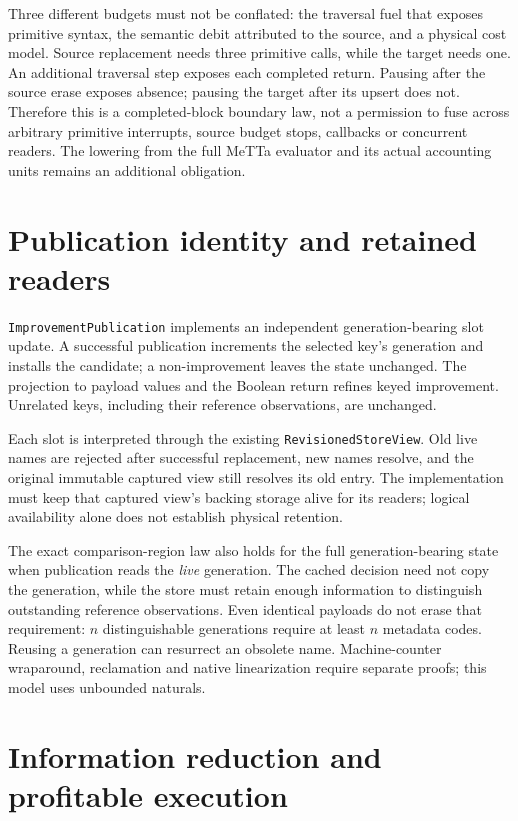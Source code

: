\documentclass[11pt,a4paper]{article}
\newcommand{\code}[1]{\nolinkurl{#1}}
\begin{document}
Three different budgets must not be conflated: the traversal fuel that exposes
primitive syntax, the semantic debit attributed to the source, and a physical
cost model. Source replacement needs three primitive calls, while the target
needs one. An additional traversal step exposes each completed return.
Pausing after the source erase exposes absence; pausing the target after its
upsert does not. Therefore this is a completed-block boundary law, not a
permission to fuse across arbitrary primitive interrupts, source budget stops,
callbacks or concurrent readers. The lowering from the full MeTTa evaluator
and its actual accounting units remains an additional obligation.

\section{Publication identity and retained readers}

\code{ImprovementPublication} implements an independent generation-bearing
slot update. A successful publication increments the selected key's generation
and installs the candidate; a non-improvement leaves the state unchanged.
The projection to payload values and the Boolean return refines keyed
improvement. Unrelated keys, including their reference observations, are
unchanged.

Each slot is interpreted through the existing \code{RevisionedStoreView}.
Old live names are rejected after successful replacement, new names resolve,
and the original immutable captured view still resolves its old entry.
The implementation must keep that captured view's backing storage alive for
its readers; logical availability alone does not establish physical retention.

The exact comparison-region law also holds for the full generation-bearing
state when publication reads the \emph{live} generation. The cached decision
need not copy the generation, while the store must retain enough information
to distinguish outstanding reference observations. Even identical payloads
do not erase that requirement: $n$ distinguishable generations require at
least $n$ metadata codes. Reusing a generation can resurrect an obsolete name.
Machine-counter wraparound, reclamation and native linearization require
separate proofs; this model uses unbounded naturals.

\section{Information reduction and profitable execution}
\end{document}

